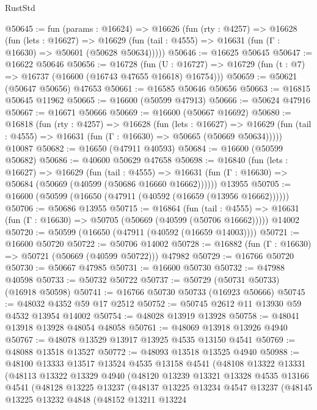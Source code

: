 \begin{lexlean}{RustStd}
\begin{coremodule}
{\begin{coremodule}
{{{{{{{{{{{{{{{{{{{{{{{{{{{{{{{{{{{{{{{{{{{{{{{{{{{{{{{@50645 := fun (params : @16624) =>
  @16626
    (fun (rty : @4257) =>
    @16628
      (fun (lets : @16627) =>
      @16629 (fun (tail : @4555) => @16631 (fun (Γ : @16630) => @50601 (@50628 @50634)))))
@50646 := @16625 @50645
@50647 := @16622 @50646
@50656 := @16728
    (fun (U : @16727) => @16729 (fun (t : @7) => @16737 (@16600 (@16743 @47655 @16618) @16754)))
@50659 := @50621 (@50647 @50656) @47653
@50661 := @16585 @50646 @50656
@50663 := @16815 @50645 @11962
@50665 := @16600 (@50599 @47913)
@50666 := @50624 @47916
@50667 := @16671 @50666
@50669 := @16600 (@50667 @16692)
@50680 := @16818
    (fun (rty : @4257) =>
    @16628
      (fun (lets : @16627) =>
      @16629 (fun (tail : @4555) => @16631 (fun (Γ : @16630) => @50665 (@50669 @50634)))))
    @10087
@50682 := @16650 (@47911 @40593)
@50684 := @16600 (@50599 @50682)
@50686 := @40600 @50629 @47658
@50698 := @16840
    (fun (lets : @16627) =>
    @16629
      (fun (tail : @4555) =>
      @16631 (fun (Γ : @16630) => @50684 (@50669 (@40599 (@50686 @16660 @16662))))))
    @13955
@50705 := @16600 (@50599 (@16650 (@47911 (@40592 (@16659 (@13956 @16662))))))
@50706 := @50686 @13955
@50715 := @16864
    (fun (tail : @4555) => @16631 (fun (Γ : @16630) => @50705 (@50669 (@40599 (@50706 @16662)))))
    @14002
@50720 := @50599 (@16650 (@47911 (@40592 (@16659 @14003))))
@50721 := @16600 @50720
@50722 := @50706 @14002
@50728 := @16882 (fun (Γ : @16630) => @50721 (@50669 (@40599 @50722))) @47982
@50729 := @16766 @50720
@50730 := @50667 @47985
@50731 := @16600 @50730
@50732 := @47988 @40598
@50733 := @50732 @50722
@50737 := @50729 (@50731 @50733) (@16918 @50598)
@50741 := @16766 @50730 @50733 (@16923 @50666)
@50745 := @48032 @4352 @59 @17 @2512
@50752 := @50745 @2612 @11 @13930 @59 @4532 @13954 @14002
@50754 := @48028 @13919 @13928
@50758 := @48041 @13918 @13928 @48054 @48058
@50761 := @48069 @13918 @13926 @4940
@50767 := @48078 @13529 @13917 @13925 @4535 @13150 @4541
@50769 := @48088 @13518 @13527
@50772 := @48093 @13518 @13525 @4940
@50988 := @48100
    @13333
    @13517
    @13524
    @4535
    @13158
    @4541
    (@48108
      @13322
      @13331
      (@48113
        @13322
        @13329
        @4940
        (@48120
          @13239
          @13321
          @13328
          @4535
          @13166
          @4541
          (@48128
            @13225
            @13237
            (@48137
              @13225
              @13234
              @4547
              @13237
              (@48145
                @13225
                @13232
                @4848
                (@48152
                  @13211
                  @13224
}}}}}}}}}}}}}}}}}}}}}}}}}}}}}}}}}}}}}}}}}}}}}}}}}}}}}}}
\end{coremodule}}
\end{coremodule}
\end{lexlean}
